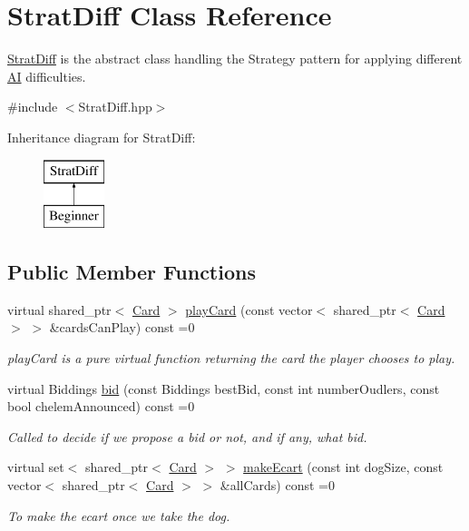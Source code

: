 \hypertarget{classStratDiff}{\section{\-Strat\-Diff \-Class \-Reference}
\label{classStratDiff}
}


\hyperlink{classStratDiff}{\-Strat\-Diff} is the abstract class handling the \-Strategy pattern for applying different \hyperlink{classAI}{\-A\-I} difficulties.  




{\ttfamily \#include $<$\-Strat\-Diff.\-hpp$>$}

\-Inheritance diagram for \-Strat\-Diff\-:\begin{figure}[H]
\begin{center}
\leavevmode
\includegraphics[height=2.000000cm]{classStratDiff}
\end{center}
\end{figure}
\subsection*{\-Public \-Member \-Functions}
\begin{DoxyCompactItemize}
\item 
virtual shared\-\_\-ptr$<$ \hyperlink{classCard}{\-Card} $>$ \hyperlink{classStratDiff_a550903bf95e6a897f346debab972f33a}{play\-Card} (const vector$<$ shared\-\_\-ptr$<$ \hyperlink{classCard}{\-Card} $>$ $>$ \&cards\-Can\-Play) const =0
\begin{DoxyCompactList}\small\item\em play\-Card is a pure virtual function returning the card the player chooses to play. \end{DoxyCompactList}\item 
virtual \-Biddings \hyperlink{classStratDiff_ac77eac57b96c445edeb36c7205cfbcf4}{bid} (const \-Biddings best\-Bid, const int number\-Oudlers, const bool chelem\-Announced) const =0
\begin{DoxyCompactList}\small\item\em \-Called to decide if we propose a bid or not, and if any, what bid. \end{DoxyCompactList}\item 
virtual set$<$ shared\-\_\-ptr$<$ \hyperlink{classCard}{\-Card} $>$ $>$ \hyperlink{classStratDiff_a892386aed17049a0d757170603fddce1}{make\-Ecart} (const int dog\-Size, const vector$<$ shared\-\_\-ptr$<$ \hyperlink{classCard}{\-Card} $>$ $>$ \&all\-Cards) const =0
\begin{DoxyCompactList}\small\item\em \-To make the ecart once we take the dog. \end{DoxyCompactList}\end{DoxyCompactItemize}


